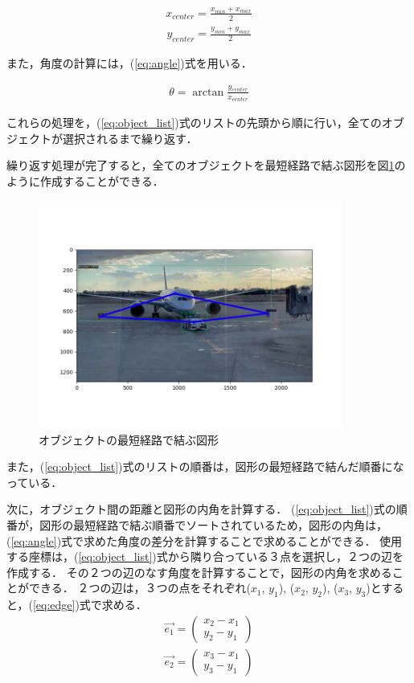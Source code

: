 \documentclass[a4j,12pt,dvipdfmx]{jreport}
\begin{document}
\begin{eqnarray}
  \label{eq:center_x}
  x_{center} = \frac{x_{min}+x_{max}}{2}
\end{eqnarray}
\begin{eqnarray}
  \label{eq:center_y}
  y_{center} = \frac{y_{min}+y_{max}}{2}
\end{eqnarray}

また，角度の計算には，(\ref{eq:angle})式を用いる．

\begin{eqnarray}
  \label{eq:angle}
  \theta = \arctan \frac{y_{center}}{x_{center}}
\end{eqnarray}

これらの処理を，(\ref{eq:object_list})式のリストの先頭から順に行い，全てのオブジェクトが選択されるまで繰り返す．

繰り返す処理が完了すると，全てのオブジェクトを最短経路で結ぶ図形を図\ref{fig:figure_2}のように作成することができる．

\begin{figure}[htbp]
  \begin{center}
    \includegraphics[width=10cm]{./image/figure_2.png}
    \caption{オブジェクトの最短経路で結ぶ図形}
    \label{fig:figure_2}
  \end{center}
\end{figure}

また，(\ref{eq:object_list})式のリストの順番は，図形の最短経路で結んだ順番になっている．

次に，オブジェクト間の距離と図形の内角を計算する．
(\ref{eq:object_list})式の順番が，図形の最短経路で結ぶ順番でソートされているため，図形の内角は，(\ref{eq:angle})式で求めた角度の差分を計算することで求めることができる．
使用する座標は，(\ref{eq:object_list})式から隣り合っている３点を選択し，２つの辺を作成する．
その２つの辺のなす角度を計算することで，図形の内角を求めることができる．
２つの辺は，３つの点をそれぞれ($x_1$, $y_1$), ($x_2$, $y_2$), ($x_3$, $y_3$)とすると，(\ref{eq:edge})式で求める．
\begin{eqnarray}
  \label{eq:edge}
  \vec{e_1} = \left( \begin{array}{c} x_2-x_1 \\ y_2-y_1 \end{array} \right) \\
  \vec{e_2} = \left( \begin{array}{c} x_3-x_1 \\ y_3-y_1 \end{array} \right)
\end{eqnarray}
\end{document}

